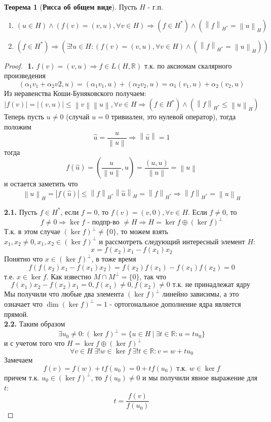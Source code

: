 \documentclass[12pt,a4paper]{article}
\theoremstyle{definition}
\newtheorem{theorem}{Теорема}
\newcommand{\Real}{\mathbb{R}}
\newcommand{\norm}[1]{\left\lVert#1\right\rVert}
\newcommand{\setbuild}[2]{\{#1\:|\:#2\}}
\begin{document}
\begin{theorem}[\textbf{Рисса об общем виде}]
	Пусть $H$ - г.п.
	\begin{enumerate}
		\item $(u \in H)\wedge(f(v)=(v,u), \forall v\in H) \Rightarrow (f\in H^*) \wedge (\norm{f}_{H^*}=\norm{u}_H)$
		\item $(f\in H^*)\Rightarrow (\exists! u\in H: (f(v)=(v,u),\forall v\in H)\wedge(\norm{f}_{H^*} = \norm{u}_H))$
	\end{enumerate}
\end{theorem}
\begin{proof}
	$ $\newline
	\textbf{1.} $f(v)=(v,u) \Rightarrow f\in L(H,\Real)$ т.к. по аксиомам скалярного произведения 
	$$(\alpha_1 v_1 + \alpha_2 v2, u) = (\alpha_1 v_1, u) + (\alpha_2 v_2, u) = \alpha_1 (v_1, u) + \alpha_2 (v_2, u)$$
	Из неравенства Коши-Буняковского получаем:
	$$|f(v)| = |(v,u)| \leq \norm{v}\norm{u},\forall v\in H \Rightarrow (f\in H^*) \wedge (\norm{f}_{H^*} \leq \norm{u}_H)$$	
	Теперь пусть $u \neq 0$ (случай $u = 0$ тривиален, это нулевой оператор), тогда положим 
	$$\hat{u} = \frac{u}{\norm{u}} \Rightarrow \norm{\hat{u}} = 1$$ 
	тогда $$f(\hat{u}) = (\frac{u}{\norm{u}}, u) = \frac{(u,u)}{\norm{u}} = \norm{u}$$
	и остается заметить что
	$$\norm{u}_H = |f(\hat{u})| \leq \norm{f}_{H^*} \norm{\hat{u}}_H = \norm{f}_{H^*} \Rightarrow \norm{f}_{H^*} = \norm{u}_{H}$$
	\newline
	
	\textbf{2.1.} Пусть $f \in H^*$, если $f = 0$, то $f(v)=(v,0),\forall v \in H$. Если $f \neq 0$, то 
	$$f \neq 0 \Rightarrow \ker{f} \text{ - подпр-во } \neq H \Rightarrow H = \ker{f} \oplus (\ker{f})^\perp$$ 
	Т.к. в этом случае $(\ker{f})^\perp \neq \{0\}$, то можем взять $x_1, x_2 \neq 0, x_1, x_2 \in (\ker{f})^\perp$ и рассмотреть следующий интересный элемент $H$:
	$$x = f(x_2)x_1 - f(x_1)x_2$$
	Понятно что $x \in (\ker{f})^\perp$, в тоже время
	$$f(f(x_2)x_1 - f(x_1)x_2) = f(x_2)f(x_1) - f(x_1)f(x_2) = 0$$ т.е. $x \in \ker{f}$. Как известно $M\cap M^\perp = \{0\}$, так что
	$$f(x_1)x_2 - f(x_2)x_1 = 0, f(x_1) \neq 0, f(x_2) \neq 0 \text{ т.к. не принадлежат ядру }$$
	Мы получили что любые два элемента $(\ker{f})^\perp$ линейно зависимы, а это означает что $\dim{(\ker{f})^\perp} = 1$ - ортогональное дополнение ядра является прямой. \\
	
	\textbf{2.2.} Таким образом $$\exists u_0 \neq 0: (\ker{f})^\perp = \setbuild{u\in H}{\exists t \in \Real: u = t u_0}$$
	и с учетом того что $H = \ker{f} \oplus (\ker{f})^\perp$
	$$\forall v \in H \: \exists!w\in\ker{f} \: \exists!t\in\Real: v = w + tu_0$$ 
	Замечаем
	$$f(v) = f(w) + tf(u_0) = 0 + tf(u_0) \text{ т.к. } w\in\ker{f} $$
	причем т.к. $u_0 \in (\ker{f})^\perp$, то $f(u_0) \neq 0$ и мы получили явное выражение для $t$:
	$$t = \frac{f(v)}{f(u_0)} $$
	

\end{proof}
\end{document}
